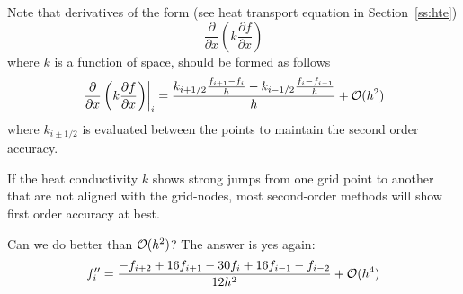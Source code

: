 Note that derivatives of the form (see heat transport equation in Section~\ref{ss:hte}) 
\begin{equation}
\frac{\partial }{\partial x} \left(  k  \frac{\partial f}{\partial x} \right)
\end{equation}
where $k$ is a function of space, should be formed as follows
\begin{equation}
\left. \frac{\partial }{\partial x} \left(  k  \frac{\partial f}{\partial x} \right) \right|_i
=
\frac{ k_{i+1/2} \frac{f_{i+1}-f_i}{h} - k_{i-1/2}\frac{f_i-f_{i-1}}{h}    }{h} + {\cal O}(h^2)
\end{equation}
where $k_{i\pm 1/2}$ is evaluated between the points to maintain the second order accuracy.

\begin{remark}
If the heat conductivity $k$ shows strong jumps from one grid point to another that are not aligned with
the grid-nodes, most second-order methods will show first order accuracy at best.
\end{remark}


\noindent Can we do better than ${\cal O}(h^2)$? The answer is yes again:
\[
f_i'' = \frac{-f_{i+2} + 16 f_{i+1} -30 f_i + 16 f_{i-1} - f_{i-2} }{12 h^2} + {\cal O}(h^4)
\]



\vspace{1cm}




